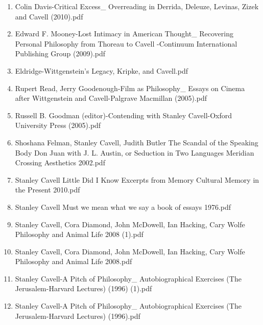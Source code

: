 \documentclass[11pt]{article}
\begin{document}
\begin{enumerate}
\begin{enumerate}
\item Colin Davis-Critical Excess\_ Overreading in Derrida, Deleuze, Levinas, Zizek and Cavell (2010).pdf
\label{sec-1-1-1-1-34-32-3}

\item Edward F. Mooney-Lost Intimacy in American Thought\_ Recovering Personal Philosophy from Thoreau to Cavell  -Continuum International Publishing Group (2009).pdf
\label{sec-1-1-1-1-34-32-4}

\item Eldridge-Wittgenstein's Legacy, Kripke, and Cavell.pdf
\label{sec-1-1-1-1-34-32-5}

\item Rupert Read, Jerry Goodenough-Film as Philosophy\_ Essays on Cinema after Wittgenstein and Cavell-Palgrave Macmillan (2005).pdf
\label{sec-1-1-1-1-34-32-6}

\item Russell B. Goodman (editor)-Contending with Stanley Cavell-Oxford University Press (2005).pdf
\label{sec-1-1-1-1-34-32-7}

\item Shoshana Felman, Stanley Cavell, Judith Butler The Scandal of the Speaking Body Don Juan with J. L. Austin, or Seduction in Two Languages Meridian Crossing Aesthetics  2002.pdf
\label{sec-1-1-1-1-34-32-8}

\item Stanley Cavell Little Did I Know Excerpts from Memory Cultural Memory in the Present  2010.pdf
\label{sec-1-1-1-1-34-32-9}

\item Stanley Cavell Must we mean what we say a book of essays  1976.pdf
\label{sec-1-1-1-1-34-32-10}

\item Stanley Cavell, Cora Diamond, John McDowell, Ian Hacking, Cary Wolfe Philosophy and Animal Life  2008 (1).pdf
\label{sec-1-1-1-1-34-32-11}

\item Stanley Cavell, Cora Diamond, John McDowell, Ian Hacking, Cary Wolfe Philosophy and Animal Life  2008.pdf
\label{sec-1-1-1-1-34-32-12}

\item Stanley Cavell-A Pitch of Philosophy\_ Autobiographical Exercises (The Jerusalem-Harvard Lectures) (1996) (1).pdf
\label{sec-1-1-1-1-34-32-13}

\item Stanley Cavell-A Pitch of Philosophy\_ Autobiographical Exercises (The Jerusalem-Harvard Lectures) (1996).pdf
\label{sec-1-1-1-1-34-32-14}


\end{enumerate}
\end{enumerate}
\end{document}
